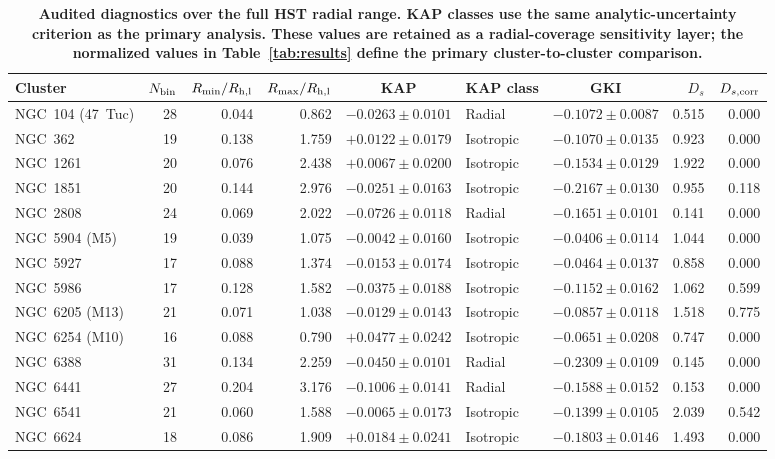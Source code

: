 \begin{table}
\centering
\caption{\textbf{Audited diagnostics over the full HST radial range. KAP classes use the same analytic-uncertainty criterion as the primary analysis. These values are retained as a radial-coverage sensitivity layer; the normalized values in Table~\ref{tab:results} define the primary cluster-to-cluster comparison.}}
\label{tab:full_results}
\scriptsize
\setlength{\tabcolsep}{3.5pt}
\begin{tabular}{lrrrclcrr}
\hline
Cluster & $N_{\rm bin}$ & $R_{\min}/R_{\rm h,l}$ & $R_{\max}/R_{\rm h,l}$ & KAP & KAP class & GKI & $D_s$ & $D_{s,\rm corr}$ \\
\hline
NGC~104 (47~Tuc) & 28 & 0.044 & 0.862 & $-0.0263\pm0.0101$ & Radial & $-0.1072\pm0.0087$ & 0.515 & 0.000 \\
NGC~362 & 19 & 0.138 & 1.759 & $+0.0122\pm0.0179$ & Isotropic & $-0.1070\pm0.0135$ & 0.923 & 0.000 \\
NGC~1261 & 20 & 0.076 & 2.438 & $+0.0067\pm0.0200$ & Isotropic & $-0.1534\pm0.0129$ & 1.922 & 0.000 \\
NGC~1851 & 20 & 0.144 & 2.976 & $-0.0251\pm0.0163$ & Isotropic & $-0.2167\pm0.0130$ & 0.955 & 0.118 \\
NGC~2808 & 24 & 0.069 & 2.022 & $-0.0726\pm0.0118$ & Radial & $-0.1651\pm0.0101$ & 0.141 & 0.000 \\
NGC~5904 (M5) & 19 & 0.039 & 1.075 & $-0.0042\pm0.0160$ & Isotropic & $-0.0406\pm0.0114$ & 1.044 & 0.000 \\
NGC~5927 & 17 & 0.088 & 1.374 & $-0.0153\pm0.0174$ & Isotropic & $-0.0464\pm0.0137$ & 0.858 & 0.000 \\
NGC~5986 & 17 & 0.128 & 1.582 & $-0.0375\pm0.0188$ & Isotropic & $-0.1152\pm0.0162$ & 1.062 & 0.599 \\
NGC~6205 (M13) & 21 & 0.071 & 1.038 & $-0.0129\pm0.0143$ & Isotropic & $-0.0857\pm0.0118$ & 1.518 & 0.775 \\
NGC~6254 (M10) & 16 & 0.088 & 0.790 & $+0.0477\pm0.0242$ & Isotropic & $-0.0651\pm0.0208$ & 0.747 & 0.000 \\
NGC~6388 & 31 & 0.134 & 2.259 & $-0.0450\pm0.0101$ & Radial & $-0.2309\pm0.0109$ & 0.145 & 0.000 \\
NGC~6441 & 27 & 0.204 & 3.176 & $-0.1006\pm0.0141$ & Radial & $-0.1588\pm0.0152$ & 0.153 & 0.000 \\
NGC~6541 & 21 & 0.060 & 1.588 & $-0.0065\pm0.0173$ & Isotropic & $-0.1399\pm0.0105$ & 2.039 & 0.542 \\
NGC~6624 & 18 & 0.086 & 1.909 & $+0.0184\pm0.0241$ & Isotropic & $-0.1803\pm0.0146$ & 1.493 & 0.000 \\

\end{tabular}
\end{table}
